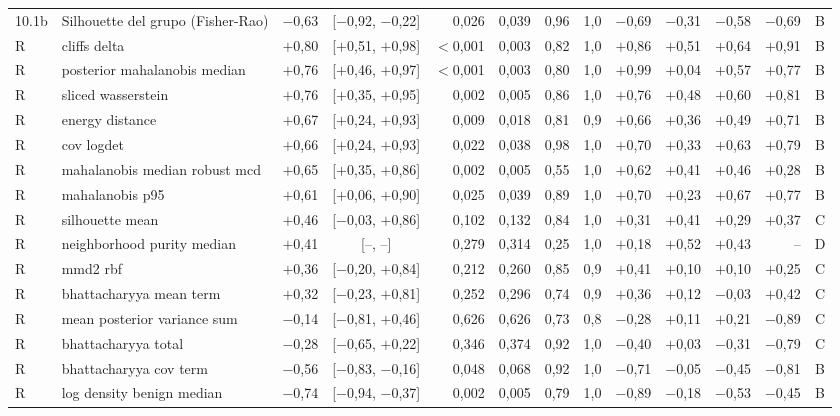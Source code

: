 \begin{longtable}{@{}l>{\raggedright\arraybackslash}p{3.6cm}rcrrrrrrrrc@{}}
10.1b & Silhouette del grupo (Fisher-Rao) & $-$0{,}63 & [$-$0{,}92, $-$0{,}22] & 0{,}026 & 0{,}039 & 0{,}96 & 1{,}0 & $-$0{,}69 & $-$0{,}31 & $-$0{,}58 & $-$0{,}69 & B \\
R & cliffs delta & $+$0{,}80 & [$+$0{,}51, $+$0{,}98] & $<$0{,}001 & 0{,}003 & 0{,}82 & 1{,}0 & $+$0{,}86 & $+$0{,}51 & $+$0{,}64 & $+$0{,}91 & B \\
R & posterior mahalanobis median & $+$0{,}76 & [$+$0{,}46, $+$0{,}97] & $<$0{,}001 & 0{,}003 & 0{,}80 & 1{,}0 & $+$0{,}99 & $+$0{,}04 & $+$0{,}57 & $+$0{,}77 & B \\
R & sliced wasserstein & $+$0{,}76 & [$+$0{,}35, $+$0{,}95] & 0{,}002 & 0{,}005 & 0{,}86 & 1{,}0 & $+$0{,}76 & $+$0{,}48 & $+$0{,}60 & $+$0{,}81 & B \\
R & energy distance & $+$0{,}67 & [$+$0{,}24, $+$0{,}93] & 0{,}009 & 0{,}018 & 0{,}81 & 0{,}9 & $+$0{,}66 & $+$0{,}36 & $+$0{,}49 & $+$0{,}71 & B \\
R & cov logdet & $+$0{,}66 & [$+$0{,}24, $+$0{,}93] & 0{,}022 & 0{,}038 & 0{,}98 & 1{,}0 & $+$0{,}70 & $+$0{,}33 & $+$0{,}63 & $+$0{,}79 & B \\
R & mahalanobis median robust mcd & $+$0{,}65 & [$+$0{,}35, $+$0{,}86] & 0{,}002 & 0{,}005 & 0{,}55 & 1{,}0 & $+$0{,}62 & $+$0{,}41 & $+$0{,}46 & $+$0{,}28 & B \\
R & mahalanobis p95 & $+$0{,}61 & [$+$0{,}06, $+$0{,}90] & 0{,}025 & 0{,}039 & 0{,}89 & 1{,}0 & $+$0{,}70 & $+$0{,}23 & $+$0{,}67 & $+$0{,}77 & B \\
R & silhouette mean & $+$0{,}46 & [$-$0{,}03, $+$0{,}86] & 0{,}102 & 0{,}132 & 0{,}84 & 1{,}0 & $+$0{,}31 & $+$0{,}41 & $+$0{,}29 & $+$0{,}37 & C \\
R & neighborhood purity median & $+$0{,}41 & [--, --] & 0{,}279 & 0{,}314 & 0{,}25 & 1{,}0 & $+$0{,}18 & $+$0{,}52 & $+$0{,}43 & -- & D \\
R & mmd2 rbf & $+$0{,}36 & [$-$0{,}20, $+$0{,}84] & 0{,}212 & 0{,}260 & 0{,}85 & 0{,}9 & $+$0{,}41 & $+$0{,}10 & $+$0{,}10 & $+$0{,}25 & C \\
R & bhattacharyya mean term & $+$0{,}32 & [$-$0{,}23, $+$0{,}81] & 0{,}252 & 0{,}296 & 0{,}74 & 0{,}9 & $+$0{,}36 & $+$0{,}12 & $-$0{,}03 & $+$0{,}42 & C \\
R & mean posterior variance sum & $-$0{,}14 & [$-$0{,}81, $+$0{,}46] & 0{,}626 & 0{,}626 & 0{,}73 & 0{,}8 & $-$0{,}28 & $+$0{,}11 & $+$0{,}21 & $-$0{,}89 & C \\
R & bhattacharyya total & $-$0{,}28 & [$-$0{,}65, $+$0{,}22] & 0{,}346 & 0{,}374 & 0{,}92 & 1{,}0 & $-$0{,}40 & $+$0{,}03 & $-$0{,}31 & $-$0{,}79 & C \\
R & bhattacharyya cov term & $-$0{,}56 & [$-$0{,}83, $-$0{,}16] & 0{,}048 & 0{,}068 & 0{,}92 & 1{,}0 & $-$0{,}71 & $-$0{,}05 & $-$0{,}45 & $-$0{,}81 & B \\
R & log density benign median & $-$0{,}74 & [$-$0{,}94, $-$0{,}37] & 0{,}002 & 0{,}005 & 0{,}79 & 1{,}0 & $-$0{,}89 & $-$0{,}18 & $-$0{,}53 & $-$0{,}45 & B \\
\bottomrule
\end{longtable}
